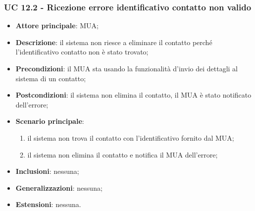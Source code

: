 \subsubsection{UC 12.2 - Ricezione errore identificativo contatto non valido} \label{sec:UC11.2}
    \begin{itemize}
        \item \textbf{Attore principale}: MUA;
        \item \textbf{Descrizione}: il sistema non riesce a eliminare il contatto perché l'identificativo contatto non è stato trovato;
        \item \textbf{Precondizioni}: il MUA sta usando la funzionalità d'invio dei dettagli al sistema di un contatto;
        \item \textbf{Postcondizioni}: il sistema non elimina il contatto, il MUA è stato notificato dell'errore;
        \item \textbf{Scenario principale}:
            \begin{enumerate}
                \item il sistema non trova il contatto con l'identificativo fornito dal MUA;
                \item il sistema non elimina il contatto e notifica il MUA dell'errore;
            \end{enumerate}
        \item \textbf{Inclusioni}: nessuna;
        \item \textbf{Generalizzazioni}: nessuna;
        \item \textbf{Estensioni}: nessuna.
    \end{itemize}
